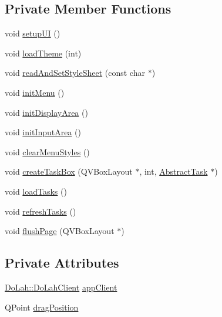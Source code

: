\subsection*{Private Member Functions}
\begin{DoxyCompactItemize}
\item 
void \hyperlink{class_do_lah_1_1_do_lah_u_i_aec7e286bc67f57d2f125eb7a3085b099}{setup\+U\+I} ()
\item 
void \hyperlink{class_do_lah_1_1_do_lah_u_i_a0e93ba601794e4954496b1b28ecfb40c}{load\+Theme} (int)
\item 
void \hyperlink{class_do_lah_1_1_do_lah_u_i_af40a78d39a980ad2e525f24a834c6d88}{read\+And\+Set\+Style\+Sheet} (const char $\ast$)
\item 
void \hyperlink{class_do_lah_1_1_do_lah_u_i_afcf7b7bc62c10ae88f0d52f30fdbfdaf}{init\+Menu} ()
\item 
void \hyperlink{class_do_lah_1_1_do_lah_u_i_ac3c868605bee91675fb77a5d75fd6391}{init\+Display\+Area} ()
\item 
void \hyperlink{class_do_lah_1_1_do_lah_u_i_ac35a9678c46a90d2ad643aa302ef2c60}{init\+Input\+Area} ()
\item 
void \hyperlink{class_do_lah_1_1_do_lah_u_i_aead5c671708c2021647964e6642b6df6}{clear\+Menu\+Styles} ()
\item 
void \hyperlink{class_do_lah_1_1_do_lah_u_i_a9e4302137f38a2fe4e3d25ddd316e365}{create\+Task\+Box} (Q\+V\+Box\+Layout $\ast$, int, \hyperlink{class_do_lah_1_1_abstract_task}{Abstract\+Task} $\ast$)
\item 
void \hyperlink{class_do_lah_1_1_do_lah_u_i_a85abb292fbb1d70489d3f45df79b8b2e}{load\+Tasks} ()
\item 
void \hyperlink{class_do_lah_1_1_do_lah_u_i_a4a5e26db6f379eb67b6e2cce527d41ec}{refresh\+Tasks} ()
\item 
void \hyperlink{class_do_lah_1_1_do_lah_u_i_aef4c195a731c21951a7da1e39cb96d32}{flush\+Page} (Q\+V\+Box\+Layout $\ast$)
\end{DoxyCompactItemize}
\subsection*{Private Attributes}
\begin{DoxyCompactItemize}
\item 
\hyperlink{class_do_lah_1_1_do_lah_client}{Do\+Lah\+::\+Do\+Lah\+Client} \hyperlink{class_do_lah_1_1_do_lah_u_i_a572306153f659c9152387d28fa2cd3c4}{app\+Client}
\item 
Q\+Point \hyperlink{class_do_lah_1_1_do_lah_u_i_a81fd0c67d9f3a2050163841482203b4a}{drag\+Position}
\end{DoxyCompactItemize}


